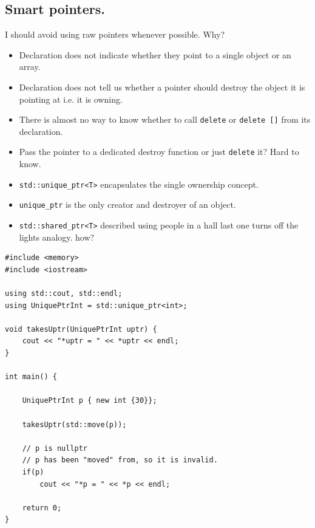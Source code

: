 \documentclass[a4paper]{article}
\begin{document}
\subsection*{Smart pointers.}

I should avoid using raw pointers whenever possible. Why?
\lstset{style=custom-cpp}

\begin{itemize}
    \item Declaration does not indicate whether they point to a single object or an array.
    \item Declaration does not tell us whether a pointer should destroy the object it is pointing at i.e. it is owning.
    \item There is almost no way to know whether to call \lstinline{delete} or \lstinline{delete []} from its declaration.
    \item Pass the pointer to a dedicated destroy function or just \lstinline{delete} it? Hard to know.
\end{itemize}

\lstset{style=custom-cpp}
% 

\begin{itemize}
    \item \lstinline{std::unique_ptr<T>} encapsulates the single ownership concept.
    \item \lstinline{unique_ptr} is the only creator and destroyer of an object.
    \item \lstinline{std::shared_ptr<T>} described using people in a hall last one turns off the lights analogy. how?
\end{itemize}

\begin{lstlisting}
#include <memory>
#include <iostream>

using std::cout, std::endl;
using UniquePtrInt = std::unique_ptr<int>;

void takesUptr(UniquePtrInt uptr) {
    cout << "*uptr = " << *uptr << endl;
}

int main() {
    
    UniquePtrInt p { new int {30}};

    takesUptr(std::move(p));

    // p is nullptr
    // p has been "moved" from, so it is invalid.
    if(p)
        cout << "*p = " << *p << endl;

    return 0;
}
\end{lstlisting}
\end{document}
